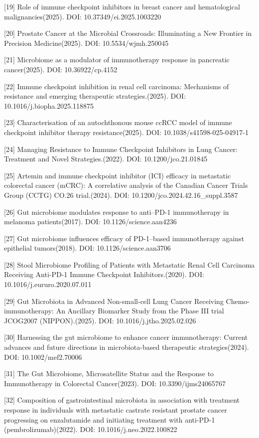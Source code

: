{[}19{]} Role of immune checkpoint inhibitors in breast cancer and hematological malignancies(2025). DOI: 10.37349/ei.2025.1003220

{[}20{]} Prostate Cancer at the Microbial Crossroads: Illuminating a New Frontier in Precision Medicine(2025). DOI: 10.5534/wjmh.250045

{[}21{]} Microbiome as a modulator of immunotherapy response in pancreatic cancer(2025). DOI: 10.36922/cp.4152

{[}22{]} Immune checkpoint inhibition in renal cell carcinoma: Mechanisms of resistance and emerging therapeutic strategies.(2025). DOI: 10.1016/j.biopha.2025.118875

{[}23{]} Characterisation of an autochthonous mouse ccRCC model of immune checkpoint inhibitor therapy resistance(2025). DOI: 10.1038/s41598-025-04917-1

{[}24{]} Managing Resistance to Immune Checkpoint Inhibitors in Lung Cancer: Treatment and Novel Strategies.(2022). DOI: 10.1200/jco.21.01845

{[}25{]} Artemin and immune checkpoint inhibitor (ICI) efficacy in metastatic colorectal cancer (mCRC): A correlative analysis of the Canadian Cancer Trials Group (CCTG) CO.26 trial.(2024). DOI: 10.1200/jco.2024.42.16\_suppl.3587

{[}26{]} Gut microbiome modulates response to anti--PD-1 immunotherapy in melanoma patients(2017). DOI: 10.1126/science.aan4236

{[}27{]} Gut microbiome influences efficacy of PD-1--based immunotherapy against epithelial tumors(2018). DOI: 10.1126/science.aan3706

{[}28{]} Stool Microbiome Profiling of Patients with Metastatic Renal Cell Carcinoma Receiving Anti-PD-1 Immune Checkpoint Inhibitors.(2020). DOI: 10.1016/j.eururo.2020.07.011

{[}29{]} Gut Microbiota in Advanced Non-small-cell Lung Cancer Receiving Chemo-immunotherapy: An Ancillary Biomarker Study from the Phase III trial JCOG2007 (NIPPON).(2025). DOI: 10.1016/j.jtho.2025.02.026

{[}30{]} Harnessing the gut microbiome to enhance cancer immunotherapy: Current advances and future directions in microbiota-based therapeutic strategies(2024). DOI: 10.1002/mef2.70006

{[}31{]} The Gut Microbiome, Microsatellite Status and the Response to Immunotherapy in Colorectal Cancer(2023). DOI: 10.3390/ijms24065767

{[}32{]} Composition of gastrointestinal microbiota in association with treatment response in individuals with metastatic castrate resistant prostate cancer progressing on enzalutamide and initiating treatment with anti-PD-1 (pembrolizumab)(2022). DOI: 10.1016/j.neo.2022.100822

